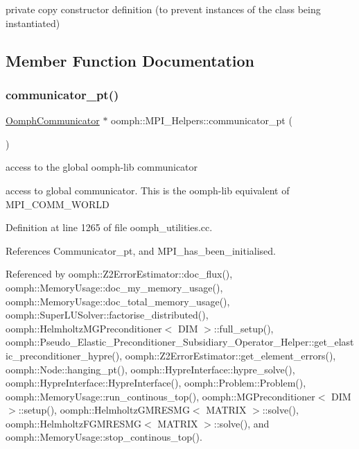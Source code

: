 private copy constructor definition (to prevent instances of the class being instantiated) 



\subsection{Member Function Documentation}
\mbox{\label{classoomph_1_1MPI__Helpers_ac16964b22bfd4f657490802beb600ffe}} 
\subsubsection{\texorpdfstring{communicator\+\_\+pt()}{communicator\_pt()}}
{\footnotesize\ttfamily \hyperlink{classoomph_1_1OomphCommunicator}{Oomph\+Communicator} $\ast$ oomph\+::\+M\+P\+I\+\_\+\+Helpers\+::communicator\+\_\+pt (\begin{DoxyParamCaption}{ }\end{DoxyParamCaption})\hspace{0.3cm}{\ttfamily [static]}}



access to the global oomph-\/lib communicator 

access to global communicator. This is the oomph-\/lib equivalent of M\+P\+I\+\_\+\+C\+O\+M\+M\+\_\+\+W\+O\+R\+LD 

Definition at line 1265 of file oomph\+\_\+utilities.\+cc.



References Communicator\+\_\+pt, and M\+P\+I\+\_\+has\+\_\+been\+\_\+initialised.



Referenced by oomph\+::\+Z2\+Error\+Estimator\+::doc\+\_\+flux(), oomph\+::\+Memory\+Usage\+::doc\+\_\+my\+\_\+memory\+\_\+usage(), oomph\+::\+Memory\+Usage\+::doc\+\_\+total\+\_\+memory\+\_\+usage(), oomph\+::\+Super\+L\+U\+Solver\+::factorise\+\_\+distributed(), oomph\+::\+Helmholtz\+M\+G\+Preconditioner$<$ D\+I\+M $>$\+::full\+\_\+setup(), oomph\+::\+Pseudo\+\_\+\+Elastic\+\_\+\+Preconditioner\+\_\+\+Subsidiary\+\_\+\+Operator\+\_\+\+Helper\+::get\+\_\+elastic\+\_\+preconditioner\+\_\+hypre(), oomph\+::\+Z2\+Error\+Estimator\+::get\+\_\+element\+\_\+errors(), oomph\+::\+Node\+::hanging\+\_\+pt(), oomph\+::\+Hypre\+Interface\+::hypre\+\_\+solve(), oomph\+::\+Hypre\+Interface\+::\+Hypre\+Interface(), oomph\+::\+Problem\+::\+Problem(), oomph\+::\+Memory\+Usage\+::run\+\_\+continous\+\_\+top(), oomph\+::\+M\+G\+Preconditioner$<$ D\+I\+M $>$\+::setup(), oomph\+::\+Helmholtz\+G\+M\+R\+E\+S\+M\+G$<$ M\+A\+T\+R\+I\+X $>$\+::solve(), oomph\+::\+Helmholtz\+F\+G\+M\+R\+E\+S\+M\+G$<$ M\+A\+T\+R\+I\+X $>$\+::solve(), and oomph\+::\+Memory\+Usage\+::stop\+\_\+continous\+\_\+top().

